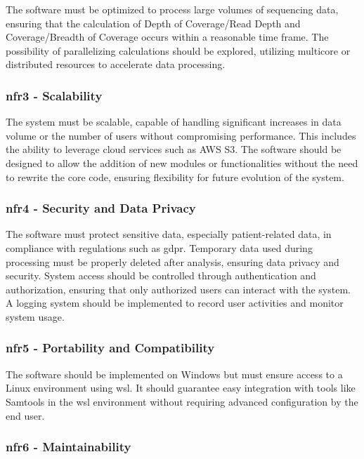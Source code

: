 The software must be optimized to process large volumes of sequencing data, ensuring that the calculation of Depth of Coverage/Read Depth and Coverage/Breadth of Coverage occurs within a reasonable time frame. The possibility of parallelizing calculations should be explored, utilizing multicore or distributed resources to accelerate data processing.

\subsubsection{\textbf{\ac{nfr}3 - Scalability}}

The system must be scalable, capable of handling significant increases in data volume or the number of users without compromising performance. This includes the ability to leverage cloud services such as AWS S3. The software should be designed to allow the addition of new modules or functionalities without the need to rewrite the core code, ensuring flexibility for future evolution of the system.

\subsubsection{\textbf{\ac{nfr}4 - Security and Data Privacy}}

The software must protect sensitive data, especially patient-related data, in compliance with regulations such as \ac{gdpr}. Temporary data used during processing must be properly deleted after analysis, ensuring data privacy and security. System access should be controlled through authentication and authorization, ensuring that only authorized users can interact with the system. A logging system should be implemented to record user activities and monitor system usage.

\subsubsection{\textbf{\ac{nfr}5 - Portability and Compatibility}}

The software should be implemented on Windows but must ensure access to a Linux environment using \ac{wsl}. It should guarantee easy integration with tools like Samtools in the \ac{wsl} environment without requiring advanced configuration by the end user.

\subsubsection{\textbf{\ac{nfr}6 - Maintainability}}

